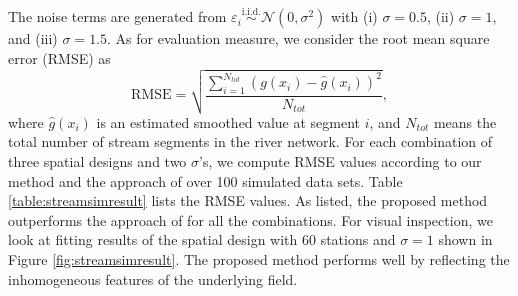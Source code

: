 \documentclass[11pt,titlepage]{article}
\begin{document}







The noise terms are generated from $\varepsilon_{i} \stackrel{\text{i.i.d.}}{\sim} \mathcal{N}(0,\sigma^{2})$ with (i) $\sigma=0.5$, (ii) $\sigma=1$, and (iii) $\sigma=1.5$. As for evaluation measure, we consider the root mean square error (RMSE) as 
\begin{equation}\label{eq:RMSE}
\text{RMSE}=\sqrt{\frac{\sum_{i=1}^{N_{tot}} (g(x_i)-\hat{g}(x_i))^{2}} {N_{tot}}},
\end{equation}
where $\hat{g}(x_i)$ is an estimated smoothed value at segment $i$, and $N_{tot}$ means the total number of stream segments in the river network. For each combination of three spatial designs and two $\sigma$'s, we compute RMSE values according to our method and the approach of \cite{ODonnell2014} over 100 simulated data sets. Table \ref{table:streamsimresult} lists the RMSE values. As listed, the proposed method outperforms the approach of \cite{ODonnell2014} for all the combinations. For visual inspection, we look at fitting results of the spatial design with 60 stations and $\sigma=1$ shown in Figure \ref{fig:streamsimresult}. The proposed method performs well by reflecting the inhomogeneous features of the underlying field.   
\end{document}
